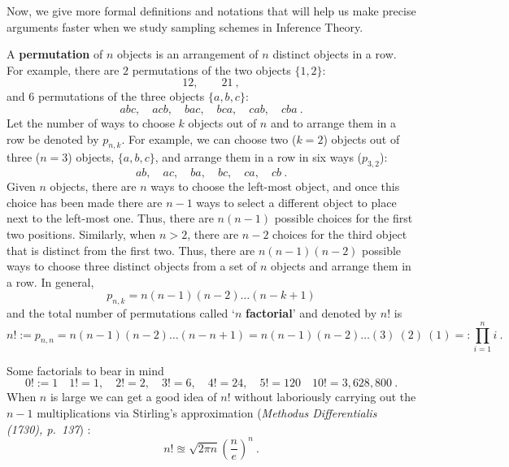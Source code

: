 \medskip
Now, we give more formal definitions and notations that will help us make precise arguments faster when we study sampling schemes in Inference Theory.

\begin{definition}
A {\bf permutation} of $n$ objects is an arrangement of $n$ distinct objects in a row.  For example, there are $2$ permutations of the two objects $\{1,2\}$:
\[
12, \qquad 21 \ ,
\]
and $6$ permutations of the three objects $\{a,b,c\}$:
\[
abc, \quad acb, \quad bac, \quad bca, \quad cab, \quad cba \ .
\]
Let the number of ways to choose $k$ objects out of $n$ and to arrange them in a row be denoted by $p_{n,k}$.  For example, we can choose two ($k=2$) objects out of three ($n=3$) objects, $\{a,b,c\}$, and arrange them in a row in six ways ($p_{3,2}$):
\[
ab, \quad ac, \quad ba, \quad bc, \quad ca, \quad cb \ .
\]
Given $n$ objects, there are $n$ ways to choose the left-most object, and once this choice has been made there are $n-1$ ways to select a different object to place next to the left-most one.  Thus, there are $n(n-1)$ possible choices for the first two positions.  Similarly, when $n>2$, there are $n-2$ choices for the third object that is distinct from the first two.  Thus, there are $n(n-1)(n-2)$ possible ways to choose three distinct objects from a set of $n$ objects and arrange them in a row.  In general,
\[
p_{n,k} = n(n-1)(n-2)\ldots (n-k+1)
\]
and the total number of permutations called `$n$ {\bf factorial}' and denoted by $n!$ is
\[
n! := p_{n,n} = n (n-1) (n-2)\ldots (n-n+1) = n (n-1) (n-2)\ldots (3) \ (2) \ (1) =: \prod_{i=1}^n i \ .
\]
\end{definition}

Some factorials to bear in mind
\[
0! := 1 \quad 1!=1, \quad 2!=2, \quad 3!=6, \quad 4!=24, \quad 5!=120 \quad 10!=3,628,800 \ .
\]
When $n$ is large we can get a good idea of $n!$ without laboriously carrying out the $n-1$ multiplications via Stirling's approximation ({\it Methodus Differentialis (1730), p.~137}) :
\[
n! \approxeq \sqrt{2 \pi n} \left( \frac{n}{e} \right)^n \ .
\]

